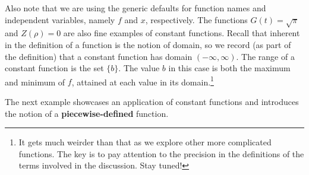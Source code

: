\documentclass{ximera}
\begin{document}
Also note that we are using the generic defaults for function names and independent variables, namely $f$ and $x$, respectively.   The functions  $G(t) = \sqrt{\pi}$ and $Z(\rho) = 0$ are also fine examples of constant functions.  Recall that inherent in the definition of a function is the notion of domain, so we record (as part of the definition) that a constant function has domain $(-\infty, \infty)$.  The range of a constant function is the set $\{b \}$.  The value $b$ in this case is both the maximum and minimum of $f$, attained at each value in its domain.\footnote{It gets much weirder than that as we explore other more complicated functions.  The key is to pay attention to the precision in the definitions of the terms involved in the discussion. Stay tuned!}\label{rangeofconstantismaxandmin}



The next example showcases an application of constant functions and introduces the notion of a \textbf{piecewise-defined} function.
\end{document}
